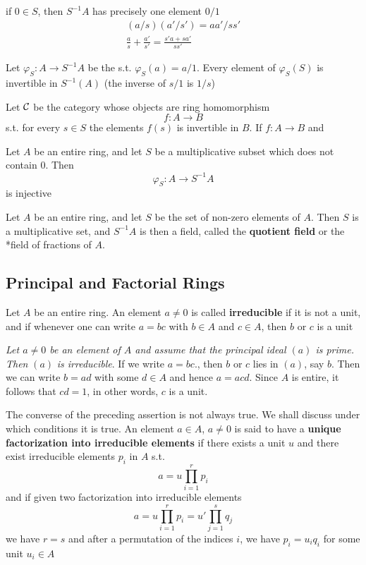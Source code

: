 \documentclass[11pt]{article}
\begin{document}
if \(0\in  S\), then \(S^{-1}A\) has precisely one element \(0/1\)
\begin{gather*}
(a/s)(a'/s')=aa'/ss'\\
\frac{a}{s}+\frac{a'}{s'}=\frac{s'a+sa'}{ss'}
\end{gather*}

Let \(\varphi_S:A\to S^{-1}A\) be the s.t. \(\varphi_S(a)=a/1\). Every element of \(\varphi_S(S)\) is invertible
in \(S^{-1}(A)\) (the inverse of \(s/1\) is \(1/s\))

Let \(\mathcal{C}\) be the category whose objects are ring homomorphism
\begin{equation*}
f:A\to B
\end{equation*}
s.t. for every \(s\in S\) the elements \(f(s)\) is invertible in \(B\). If \(f:A\to B\) and

\begin{proposition}[]
Let \(A\) be an entire ring, and let \(S\) be a multiplicative subset which does not contain 0.
Then
\begin{equation*}
\varphi_S:A\to S^{-1}A
\end{equation*}
is injective
\end{proposition}

Let \(A\) be an entire ring, and let \(S\) be the set of non-zero elements of \(A\). Then \(S\)
is a multiplicative set, and \(S^{-1}A\) is then a field, called the \textbf{quotient field} or the *field
of fractions of \(A\).

\subsection{Principal and Factorial Rings}
\label{sec:orgd4fa35d}
Let \(A\) be an entire ring. An element \(a\neq 0\) is called \textbf{irreducible} if it is not a unit, and
if whenever one can write \(a=bc\) with \(b\in A\) and \(c\in A\), then \(b\) or \(c\) is a unit

\emph{Let \(a\neq 0\) be an element of \(A\) and assume that the principal ideal \((a)\) is prime. Then}
\((a)\) \emph{is irreducible}. If we write \(a=bc\)., then \(b\) or \(c\) lies in \((a)\), say \(b\).
Then we can write \(b=ad\) with some \(d\in A\) and hence \(a=acd\). Since \(A\) is entire, it
follows that \(cd=1\), in other words, \(c\) is a unit.

The converse of the preceding assertion is not always true. We shall discuss under which
conditions it is true. An element \(a\in A\), \(a\neq 0\) is said to have a
\textbf{unique factorization into irreducible elements} if there exists a unit \(u\) and there exist
irreducible elements \(p_i\) in \(A\) s.t.
\begin{equation*}
a=u\prod_{i=1}^rp_i
\end{equation*}
and if given two factorization into irreducible elements
\begin{equation*}
a=u\prod_{i=1}^rp_i=u'\prod_{j=1}^sq_j
\end{equation*}
we have \(r=s\) and after a permutation of the indices \(i\), we have \(p_i=u_iq_i\) for some
unit \(u_i\in A\)
\end{document}
